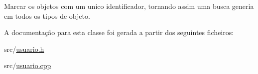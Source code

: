 Marcar os objetos com um unico identificador, tornando assim uma busca generia em todos os tipos de objeto. 



A documentação para esta classe foi gerada a partir dos seguintes ficheiros\+:\begin{DoxyCompactItemize}
\item 
src/\hyperlink{usuario_8h}{usuario.\+h}\item 
src/\hyperlink{usuario_8cpp}{usuario.\+cpp}\end{DoxyCompactItemize}
